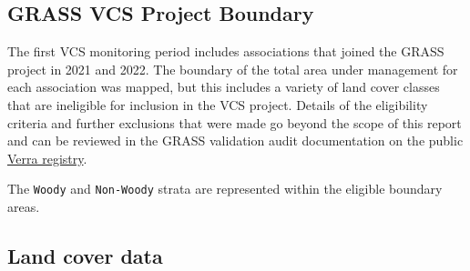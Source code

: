\documentclass[
  letterpaper,
  DIV=11,
  numbers=noendperiod]{scrartcl}
\begin{document}
\subsection{GRASS VCS Project
Boundary}\label{grass-vcs-project-boundary}

The first VCS monitoring period includes associations that joined the
GRASS project in 2021 and 2022. The boundary of the total area under
management for each association was mapped, but this includes a variety
of land cover classes that are ineligible for inclusion in the VCS
project. Details of the eligibility criteria and further exclusions that
were made go beyond the scope of this report and can be reviewed in the
GRASS validation audit documentation on the public
\href{https://registry.verra.org/app/projectDetail/VCS/2349}{Verra
registry}.

The \texttt{Woody} and \texttt{Non-Woody} strata are represented within
the eligible boundary areas.

\begin{table}

\caption{\label{tbl-lndscape-area}}


\end{table}%

\subsection{Land cover data}\label{land-cover-data}
\end{document}
